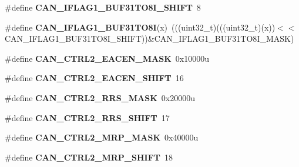 \begin{DoxyCompactItemize}
\item 
\#define {\bfseries C\+A\+N\+\_\+\+I\+F\+L\+A\+G1\+\_\+\+B\+U\+F31\+T\+O8\+I\+\_\+\+S\+H\+I\+FT}~8\hypertarget{group__CAN__Register__Masks_gaeb0d9f42c855b318796736ab6cc2de75}{}\label{group__CAN__Register__Masks_gaeb0d9f42c855b318796736ab6cc2de75}

\item 
\#define {\bfseries C\+A\+N\+\_\+\+I\+F\+L\+A\+G1\+\_\+\+B\+U\+F31\+T\+O8I}(x)~(((uint32\+\_\+t)(((uint32\+\_\+t)(x))$<$$<$C\+A\+N\+\_\+\+I\+F\+L\+A\+G1\+\_\+\+B\+U\+F31\+T\+O8\+I\+\_\+\+S\+H\+I\+FT))\&C\+A\+N\+\_\+\+I\+F\+L\+A\+G1\+\_\+\+B\+U\+F31\+T\+O8\+I\+\_\+\+M\+A\+SK)\hypertarget{group__CAN__Register__Masks_ga22a62374730326e442c1217c35584256}{}\label{group__CAN__Register__Masks_ga22a62374730326e442c1217c35584256}

\item 
\#define {\bfseries C\+A\+N\+\_\+\+C\+T\+R\+L2\+\_\+\+E\+A\+C\+E\+N\+\_\+\+M\+A\+SK}~0x10000u\hypertarget{group__CAN__Register__Masks_gacf49e8d44f1f8993cda6e29a36c7a90f}{}\label{group__CAN__Register__Masks_gacf49e8d44f1f8993cda6e29a36c7a90f}

\item 
\#define {\bfseries C\+A\+N\+\_\+\+C\+T\+R\+L2\+\_\+\+E\+A\+C\+E\+N\+\_\+\+S\+H\+I\+FT}~16\hypertarget{group__CAN__Register__Masks_gae0e425b33b8b975d6a33b8e090e040e8}{}\label{group__CAN__Register__Masks_gae0e425b33b8b975d6a33b8e090e040e8}

\item 
\#define {\bfseries C\+A\+N\+\_\+\+C\+T\+R\+L2\+\_\+\+R\+R\+S\+\_\+\+M\+A\+SK}~0x20000u\hypertarget{group__CAN__Register__Masks_ga5776a65b75ea42afc810081a66d4e1b4}{}\label{group__CAN__Register__Masks_ga5776a65b75ea42afc810081a66d4e1b4}

\item 
\#define {\bfseries C\+A\+N\+\_\+\+C\+T\+R\+L2\+\_\+\+R\+R\+S\+\_\+\+S\+H\+I\+FT}~17\hypertarget{group__CAN__Register__Masks_ga143cc0bdd4c88978ccbe42849d3fc038}{}\label{group__CAN__Register__Masks_ga143cc0bdd4c88978ccbe42849d3fc038}

\item 
\#define {\bfseries C\+A\+N\+\_\+\+C\+T\+R\+L2\+\_\+\+M\+R\+P\+\_\+\+M\+A\+SK}~0x40000u\hypertarget{group__CAN__Register__Masks_ga7f07676c379363d679cfcb6c362e1cc6}{}\label{group__CAN__Register__Masks_ga7f07676c379363d679cfcb6c362e1cc6}

\item 
\#define {\bfseries C\+A\+N\+\_\+\+C\+T\+R\+L2\+\_\+\+M\+R\+P\+\_\+\+S\+H\+I\+FT}~18\hypertarget{group__CAN__Register__Masks_ga868c342244c921f9824c4d0c172f4081}{}\label{group__CAN__Register__Masks_ga868c342244c921f9824c4d0c172f4081}


\end{DoxyCompactItemize}
